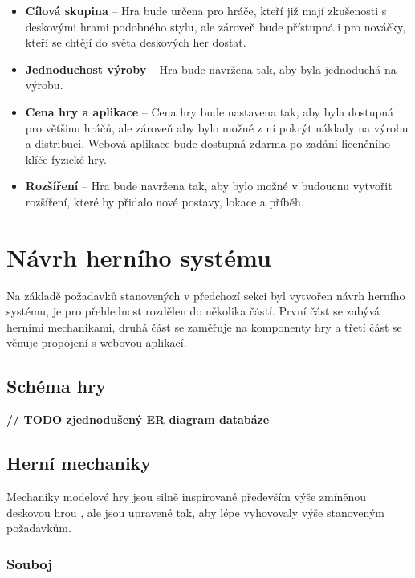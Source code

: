 \begin{itemize}
    \item \textbf{Cílová skupina} --
        Hra bude určena pro hráče, kteří již mají zkušenosti s deskovými hrami podobného stylu, ale zároveň bude přístupná i pro nováčky, kteří se chtějí do světa deskových her dostat.
    \item \textbf{Jednoduchost výroby} --
        Hra bude navržena tak, aby byla jednoduchá na výrobu.
    \item \textbf{Cena hry a aplikace} --
        Cena hry bude nastavena tak, aby byla dostupná pro většinu hráčů, ale zároveň aby bylo možné z ní pokrýt náklady na výrobu a distribuci. Webová aplikace bude dostupná zdarma po zadání licenčního klíče fyzické hry.
    \item \textbf{Rozšíření} --
        Hra bude navržena tak, aby bylo možné v budoucnu vytvořit rozšíření, které by přidalo nové postavy, lokace a příběh.
\end{itemize}



\section{Návrh herního systému}
\label{sec:design}

Na základě požadavků stanovených v předchozí sekci byl vytvořen návrh herního systému, je pro přehlednost rozdělen do několika částí. První část se zabývá herními mechanikami, druhá část se zaměřuje na komponenty hry a třetí část se věnuje propojení s webovou aplikací.

\subsection{Schéma hry}
\label{subsec:design_scheme}

\textbf{// TODO zjednodušený ER diagram databáze}

\subsection{Herní mechaniky}
\label{subsec:design_mechanics}

Mechaniky modelové hry jsou silně inspirované především výše zmíněnou deskovou hrou , ale jsou upravené tak, aby lépe vyhovovaly výše stanoveným požadavkům. 

\subsubsection*{Souboj}
\label{subsubsec:encounter}


